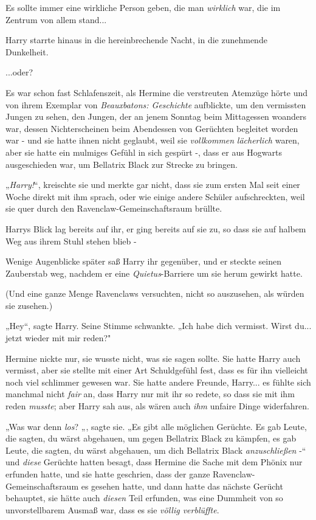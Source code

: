 {Es sollte immer eine wirkliche Person geben, die man \emph{wirklich} war, die im Zentrum von allem stand...

Harry starrte hinaus in die hereinbrechende Nacht, in die zunehmende Dunkelheit.

...oder?

Es war schon fast Schlafenszeit, als Hermine die verstreuten Atemzüge hörte und von ihrem Exemplar von \emph{Beauxbatons: Geschichte} aufblickte, um den vermissten Jungen zu sehen, den Jungen, der an jenem Sonntag beim Mittagessen woanders war, dessen Nichterscheinen beim Abendessen von Gerüchten begleitet worden war - und sie hatte ihnen nicht geglaubt, weil sie \emph{vollkommen} \emph{lächerlich} waren, aber sie hatte ein mulmiges Gefühl in sich gespürt -, dass er aus Hogwarts ausgeschieden war, um Bellatrix Black zur Strecke zu bringen.

„\emph{Harry!}“, kreischte sie und merkte gar nicht, dass sie zum ersten Mal seit einer Woche direkt mit ihm sprach, oder wie einige andere Schüler aufschreckten, weil sie quer durch den Ravenclaw-Gemeinschaftsraum brüllte.

Harrys Blick lag bereits auf ihr, er ging bereits auf sie zu, so dass sie auf halbem Weg aus ihrem Stuhl stehen blieb -

Wenige Augenblicke später saß Harry ihr gegenüber, und er steckte seinen Zauberstab weg, nachdem er eine \emph{Quietus}-Barriere um sie herum gewirkt hatte.

(Und eine ganze Menge Ravenclaws versuchten, nicht so auszusehen, als würden sie zusehen.)

„Hey“, sagte Harry. Seine Stimme schwankte. „Ich habe dich vermisst. Wirst du... jetzt wieder mit mir reden?"

Hermine nickte nur, sie wusste nicht, was sie sagen sollte. Sie hatte Harry auch vermisst, aber sie stellte mit einer Art Schuldgefühl fest, dass es für ihn vielleicht noch viel schlimmer gewesen war. Sie hatte andere Freunde, Harry... es fühlte sich manchmal nicht \emph{fair} an, dass Harry nur mit ihr so redete, so dass sie mit ihm reden \emph{musste}; aber Harry sah aus, als wären auch \emph{ihm} unfaire Dinge widerfahren.

„Was war denn \emph{los}? „, sagte sie. „Es gibt alle möglichen Gerüchte. Es gab Leute, die sagten, du wärst abgehauen, um gegen Bellatrix Black zu kämpfen, es gab Leute, die sagten, du wärst abgehauen, um dich Bellatrix Black \emph{anzuschließen} -“ und \emph{diese} Gerüchte hatten besagt, dass Hermine die Sache mit dem Phönix nur erfunden hatte, und sie hatte geschrien, dass der ganze Ravenclaw-Gemeinschaftsraum es gesehen hatte, und dann hatte das nächste Gerücht behauptet, sie hätte auch \emph{diesen} Teil erfunden, was eine Dummheit von so unvorstellbarem Ausmaß war, dass es sie \emph{völlig verblüffte}.

}

